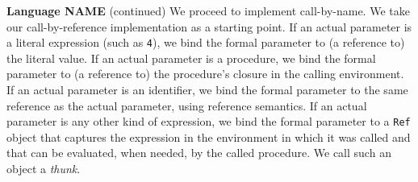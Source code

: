 \begin{minipage}[t]{\sw}
\slidenumber
\LARGE
{\bf Language NAME} (continued)\exx
We proceed to implement call-by-name.
We take our call-by-reference implementation as a starting point.\exx
If an actual parameter is a literal expression (such as \verb'4'),
we bind the formal parameter to (a reference to) the literal value.
If an actual parameter is a procedure,
we bind the formal parameter
to (a reference to) the procedure's closure in the calling environment.
If an actual parameter is an identifier,
we bind the formal parameter
to the same reference as the actual parameter,
using reference semantics.\exx
If an actual parameter is any other kind of expression,
we bind the formal parameter
to a \verb'Ref' object that captures the expression
in the environment in which it was called
and that can be evaluated, when needed, by the called procedure.
We call such an object a {\em thunk}.\exx
\end{minipage}

\clearpage
